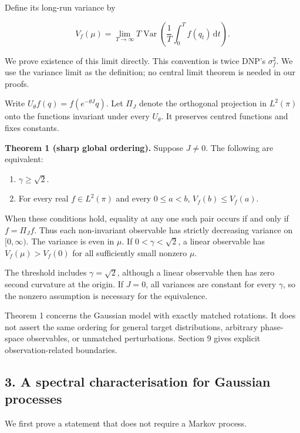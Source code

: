 \documentclass[
  british,
  11pt,
  a4paper,
]{article}
\providecommand{\tightlist}{%
  \setlength{\itemsep}{0pt}\setlength{\parskip}{0pt}}
\begin{document}
Define its long-run variance by

\[
V_f(\mu)=\lim_{T\to\infty}T\mathop{\mathrm{Var}}\left(
\frac1T\int_0^T f(q_t)\,\mathrm dt\right). \tag{2}
\]

We prove existence of this limit directly. This convention is twice
DNP's \(\sigma_f^2\). We use the variance limit as the definition; no
central limit theorem is needed in our proofs.

Write \(U_\theta f(q)=f(e^{-\theta J}q)\). Let \(\Pi_J\) denote the
orthogonal projection in \(L^2(\pi)\) onto the functions invariant under
every \(U_\theta\). It preserves centred functions and fixes constants.

\textbf{Theorem 1 (sharp global ordering).} Suppose \(J\ne0\). The
following are equivalent:

\begin{enumerate}
\def\labelenumi{\arabic{enumi}.}
\tightlist
\item
  \(\gamma\ge\sqrt2\).
\item
  For every real \(f\in L^2(\pi)\) and every \(0\le a<b\),
  \(V_f(b)\le V_f(a)\).
\end{enumerate}

When these conditions hold, equality at any one such pair occurs if and
only if \(f=\Pi_Jf\). Thus each non-invariant observable has strictly
decreasing variance on \([0,\infty)\). The variance is even in \(\mu\).
If \(0<\gamma<\sqrt2\), a linear observable has \(V_f(\mu)>V_f(0)\) for
all sufficiently small nonzero \(\mu\).

The threshold includes \(\gamma=\sqrt2\), although a linear observable
then has zero second curvature at the origin. If \(J=0\), all variances
are constant for every \(\gamma\), so the nonzero assumption is
necessary for the equivalence.

Theorem 1 concerns the Gaussian model with exactly matched rotations. It
does not assert the same ordering for general target distributions,
arbitrary phase-space observables, or unmatched perturbations. Section 9
gives explicit observation-related boundaries.

\subsection{3. A spectral characterisation for Gaussian
processes}\label{a-spectral-characterisation-for-gaussian-processes}

We first prove a statement that does not require a Markov process.
\end{document}
